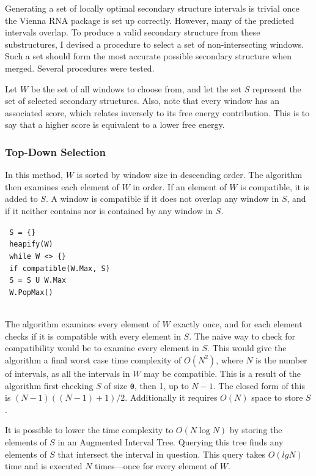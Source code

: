 \documentclass{cshonours}
\begin{document}
Generating a set of locally optimal secondary structure intervals is trivial once the Vienna RNA package is set up correctly. However, many of the predicted intervals overlap. To produce a valid secondary structure from these substructures, I devised a procedure to select a set of non-intersecting windows. Such a set should form the most accurate possible secondary structure when merged. Several procedures were tested.

Let $W$ be the set of all windows to choose from, and let the set $S$ represent the set of selected secondary structures. Also, note that every window has an associated score, which relates inversely to its free energy contribution. This is to say that a higher score is equivalent to a lower free energy.

\subsubsection{Top-Down Selection}
In this method, $W$ is sorted by window size in descending order. The algorithm then examines each element of $W$ in order. If an element of $W$ is compatible, it is added to $S$. A window is compatible if it does not overlap any window in $S$, and if it neither contains nor is contained by any window in $S$.


\texttt{
S = \{\} \\\
heapify(W)\\\
while W <> \{\} \\\
	if compatible(W.Max, S) \\\
		S = S U W.Max \\\
	W.PopMax() \\\
	}
	
	
The algorithm examines every element of $W$ exactly once, and for each element checks if it is compatible with every element in $S$. The naive way to check for compatibility would be to examine every element in $S$. This would give the algorithm a final worst case time complexity of $O(N^2)$, where $N$ is the number of intervals, as all the intervals in $W$ may be compatible. This is a result of the algorithm first checking $S$ of size \texttt{0}, then 1, up to $N-1$. The closed form of this is $(N-1)((N-1)+1) / 2$. Additionally it requires $O(N)$ space to store $S$.

It is possible to lower the time complexity to $O(N \log N)$ by storing the elements of $S$ in an Augmented Interval Tree. Querying this tree finds any elements of $S$ that intersect the interval in question. This query takes $O(lg N)$ time and is executed $N$ times---once for every element of $W$.
\end{document}
